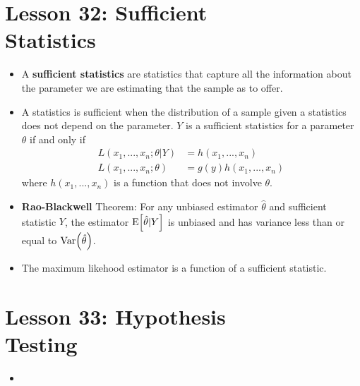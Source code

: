 \documentclass[10pt, french]{article}
\begin{document}
\begin{multicols*}{3}
\section*{Lesson 32: Sufficient \\ Statistics}
\begin{itemize}[align=left,leftmargin=*]
    \item A \textbf{sufficient statistics} are statistics that capture all the information about the parameter we are estimating that the sample as to offer.
    \item A statistics is sufficient when the distribution of a sample given a statistics does not depend on the parameter. $Y$ is a sufficient statistics for a parameter $\theta$ if and only if
    \begin{align*}
        L(x_1,...,x_n;\theta|Y) &= h(x_1,...,x_n) \\
        L(x_1,...,x_n;\theta)&= g(y)h(x_1,...,x_n)
    \end{align*}
    where $h(x_1,...,x_n)$ is a function that does not involve $\theta$.
    \item \textbf{Rao-Blackwell} Theorem: For any unbiased estimator $\hat{\theta}$ and sufficient statistic $Y$, the estimator $\mathrm{E} {\left[ \hat{\theta}|Y \right]}$ is unbiased and has variance less than or equal to $\mathrm{Var} {\left( \hat{\theta} \right)}$.
    \item The maximum likehood estimator is a function of a sufficient statistic.
\end{itemize}

\section*{Lesson 33: Hypothesis \\ Testing}
\begin{itemize}[align=left,leftmargin=*]
  \item
\end{itemize}
\end{multicols*}
\end{document}
